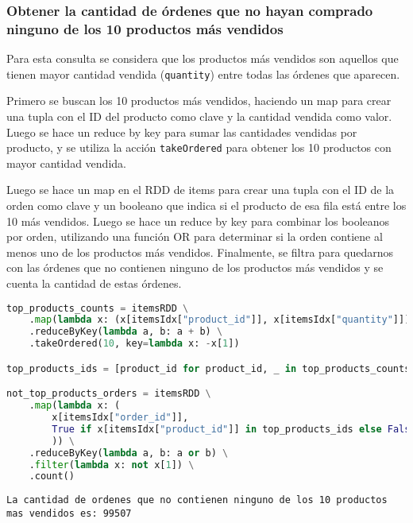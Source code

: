 \subsubsection{Obtener la cantidad de órdenes que no hayan comprado ninguno de los 10 productos más vendidos}
Para esta consulta se considera que los productos más vendidos son aquellos que tienen mayor cantidad vendida (\texttt{quantity}) entre todas las órdenes que aparecen.

Primero se buscan los 10 productos más vendidos, haciendo un map para crear una tupla con el ID del producto como clave y la cantidad vendida como valor. Luego se hace un reduce by key para sumar las cantidades vendidas por producto, y se utiliza la acción \texttt{takeOrdered} para obtener los 10 productos con mayor cantidad vendida.

Luego se hace un map en el RDD de items para crear una tupla con el ID de la orden como clave y un booleano que indica si el producto de esa fila está entre los 10 más vendidos. Luego se hace un reduce by key para combinar los booleanos por orden, utilizando una función OR para determinar si la orden contiene al menos uno de los productos más vendidos. Finalmente, se filtra para quedarnos con las órdenes que no contienen ninguno de los productos más vendidos y se cuenta la cantidad de estas órdenes.

\begin{lstlisting}[language=Python, caption=Resolución de la consulta 6 propuesta por el enunciado, label={lst:enunciado_q6}, xleftmargin=20pt, xrightmargin=20pt]
top_products_counts = itemsRDD \
    .map(lambda x: (x[itemsIdx["product_id"]], x[itemsIdx["quantity"]])) \
    .reduceByKey(lambda a, b: a + b) \
    .takeOrdered(10, key=lambda x: -x[1])

top_products_ids = [product_id for product_id, _ in top_products_counts]

not_top_products_orders = itemsRDD \
    .map(lambda x: (
        x[itemsIdx["order_id"]],
        True if x[itemsIdx["product_id"]] in top_products_ids else False
        )) \
    .reduceByKey(lambda a, b: a or b) \
    .filter(lambda x: not x[1]) \
    .count()
\end{lstlisting}

\begin{lstlisting}[style=console, caption=Resultados de la consulta 6 propuesta por el enunciado, label={lst:enunciado_q6_results}, xleftmargin=0pt, xrightmargin=0pt]
La cantidad de ordenes que no contienen ninguno de los 10 productos mas vendidos es: 99507
\end{lstlisting}